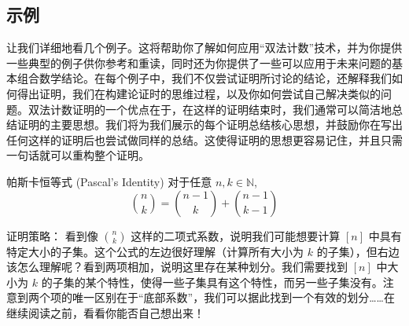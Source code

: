 
\subsection{示例}

让我们详细地看几个例子。这将帮助你了解如何应用``双法计数''技术，并为你提供一些典型的例子供你参考和重读，同时还为你提供了一些可以应用于未来问题的基本组合数学结论。在每个例子中，我们不仅尝试证明所讨论的结论，还解释我们如何得出证明，我们在构建论证时的思维过程，以及你如何尝试自己解决类似的问题。双法计数证明的一个优点在于，在这样的证明结束时，我们通常可以简洁地总结证明的主要思想。我们将为我们展示的每个证明总结核心思想，并鼓励你在写出任何这样的证明后也尝试做同样的总结。这使得证明的思想更容易记住，并且只需一句话就可以重构整个证明。

\begin{proposition}{帕斯卡恒等式 (Pascal's Identity)}
    对于任意 $n,k \in \mathbb{N}$,
    \[{n \choose k}={n-1 \choose k}+{n-1 \choose k-1}\]
\end{proposition}

\begin{questions}{证明策略：}
    看到像 ${n \choose k}$ 这样的二项式系数，说明我们可能想要计算 $[n]$ 中具有特定大小的子集。这个公式的左边很好理解（计算所有大小为 $k$ 的子集），但右边该怎么理解呢？看到两项相加，说明这里存在某种划分。我们需要找到 $[n]$ 中大小为 $k$ 的子集的某个特性，使得一些子集具有这个特性，而另一些子集没有。注意到两个项的唯一区别在于``底部系数''，我们可以据此找到一个有效的划分……在继续阅读之前，看看你能否自己想出来！
\end{questions}

